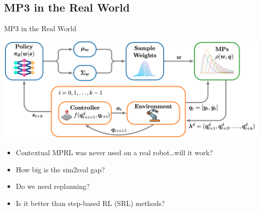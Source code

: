 \documentclass[16:9,en,navbarinfooter]{sdqbeamer}
\begin{document}
\subsection{MP3 in the Real World}
\begin{frame}{MP3 in the Real World}

	\center
	\vspace{1cm}
	\includegraphics[width=.7\linewidth]{media/mp3.png}
	\begin{itemize}
		\item Contextual MPRL was never used on a real robot\dots will it work?
		\item How big is the sim2real gap?
		\item Do we need replanning?
		\item Is it better than step-based RL (SRL) methods?
	\end{itemize}
\end{frame}
\end{document}
